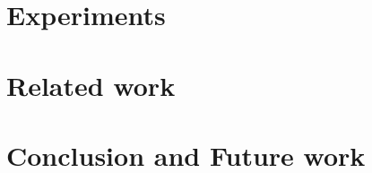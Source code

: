\documentclass[10pt]{llncs}
\begin{document}
% 

\section{Experiments}
\label{sec:experiments}


\section{Related work}
\label{sec:related}



\section{Conclusion and Future work}
\label{sec:conclusion}
%





%
\end{document}

